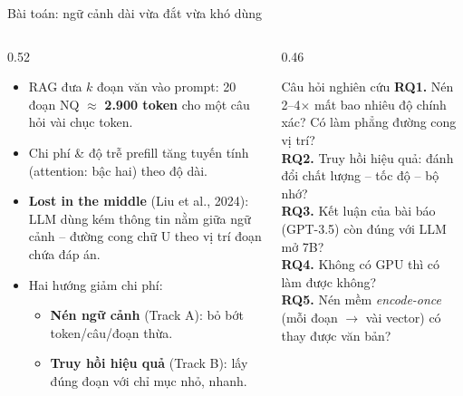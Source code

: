 \documentclass[aspectratio=169,11pt]{beamer}
\begin{document}
\begin{frame}{Bài toán: ngữ cảnh dài vừa đắt vừa khó dùng}
  \begin{columns}[T]
    \begin{column}{0.52\textwidth}
      \small
      \begin{itemize}\setlength\itemsep{0.4em}
        \item RAG đưa $k$ đoạn văn vào prompt: 20 đoạn NQ $\approx$ \textbf{2.900 token}
          cho một câu hỏi vài chục token.
        \item Chi phí \& độ trễ prefill tăng tuyến tính (attention: bậc hai) theo độ dài.
        \item \textbf{Lost in the middle} (Liu et al., 2024): LLM dùng kém thông tin nằm giữa ngữ cảnh
          -- đường cong chữ U theo vị trí đoạn chứa đáp án.
        \item Hai hướng giảm chi phí:
          \begin{itemize}
            \item \textbf{Nén ngữ cảnh} (Track A): bỏ bớt token/câu/đoạn thừa.
            \item \textbf{Truy hồi hiệu quả} (Track B): lấy đúng đoạn với chỉ mục nhỏ, nhanh.
          \end{itemize}
      \end{itemize}
    \end{column}
    \begin{column}{0.46\textwidth}
      \begin{block}{\small Câu hỏi nghiên cứu}
        \scriptsize
        \textbf{RQ1.} Nén 2--4$\times$ mất bao nhiêu độ chính xác? Có làm phẳng đường cong vị trí?\\[0.3em]
        \textbf{RQ2.} Truy hồi hiệu quả: đánh đổi chất lượng -- tốc độ -- bộ nhớ?\\[0.3em]
        \textbf{RQ3.} Kết luận của bài báo (GPT-3.5) còn đúng với LLM mở 7B?\\[0.3em]
        \textbf{RQ4.} Không có GPU thì có làm được không?\\[0.3em]
        \textbf{RQ5.} Nén mềm \emph{encode-once} (mỗi đoạn $\to$ vài vector) có thay được văn bản?
      \end{block}
    \end{column}
  \end{columns}
\end{frame}
\end{document}
